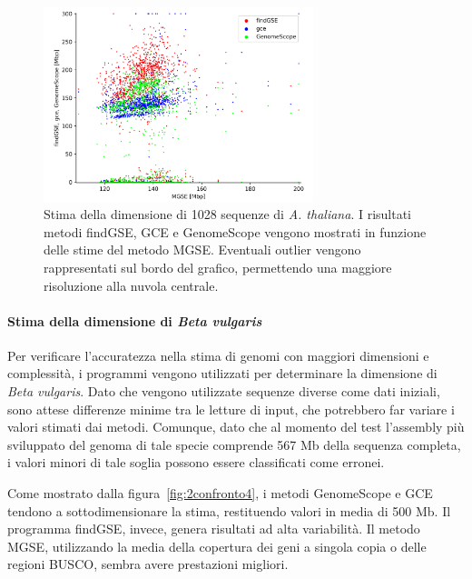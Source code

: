 \documentclass[crop=false, class=book]{standalone}
\begin{document}
	\begin{figure}[]
		\centering
		\includegraphics[width=0.7\textwidth]{capitoli/analisi/confronto/confronto2/2.png}
		\caption{Stima della dimensione di 1028 sequenze di \textit{A. thaliana}. I risultati metodi findGSE, GCE e GenomeScope vengono mostrati in funzione delle stime del metodo MGSE. Eventuali outlier vengono rappresentati sul bordo del grafico, permettendo una maggiore risoluzione alla nuvola centrale.}
		\label{fig:2confronto3}
	\end{figure} 

	\paragraph{Stima della dimensione di \textit{Beta vulgaris}}
	Per verificare l'accuratezza nella stima di genomi con maggiori dimensioni e complessità, i programmi vengono utilizzati per determinare la dimensione di \textit{Beta vulgaris}. Dato che vengono utilizzate sequenze diverse come dati iniziali, sono attese differenze minime tra le letture di input, che potrebbero far variare i valori stimati dai metodi. Comunque, dato che al momento del test l'assembly più sviluppato del genoma di tale specie comprende 567 Mb della sequenza completa, i valori minori di tale soglia possono essere classificati come erronei. 
	
	Come mostrato dalla figura~\vref{fig:2confronto4}, i metodi GenomeScope e GCE tendono a sottodimensionare la stima, restituendo valori in media di 500 Mb. Il programma findGSE, invece, genera risultati ad alta variabilità. Il metodo MGSE, utilizzando la media della copertura dei geni a singola copia o delle regioni BUSCO, sembra avere prestazioni migliori.
	
\end{document}
